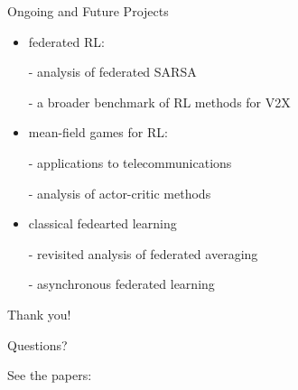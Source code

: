 \documentclass[aspectratio=169,12pt]{beamer}
\begin{document}
\begin{frame}{Ongoing and Future Projects}

  \begin{itemize}
  \item federated RL:

    - analysis of federated SARSA

    - a broader benchmark of RL methods for V2X

    \vspace{0.5em}

  \item mean-field games for RL:

    - applications to telecommunications

    - analysis of actor-critic methods

    \vspace{0.5em}
    
  \item classical fedearted learning

    - revisited analysis of federated averaging

    - asynchronous federated learning
    
  \end{itemize}
\end{frame}

\begin{frame}
  \begin{center}
    \LARGE Thank you!

    \normalsize Questions?
  \end{center}
  

  \small
  See the papers:

  ~~

  ~~

  ~~
\end{frame}

  
\end{document}
